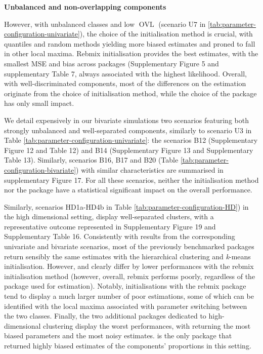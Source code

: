 \textbf{Unbalanced and non-overlapping components}

However, with unbalanced classes and low \(\operatorname{OVL}\) (scenario U7 in
\ref{tab:parameter-configuration-univariate}), the choice of the
initialisation method is crucial, with quantiles and random
methods yielding more biased estimates and proned to fall in other local
maxima. Rebmix initialisation provides the best estimates, with the
smallest MSE and bias across packages (Supplementary Figure
5 and supplementary Table 7, always associated with the highest likelihood. Overall, with
well-discriminated components, most of the differences on the estimation
originate from the choice of initialisation method, while the choice of
the package has only small impact.

We detail expensively in our bivariate simulations two scenarios featuring both strongly unbalanced and well-separated components, similarly to scenario U3 in Table \ref{tab:parameter-configuration-univariate}: the scenarios B12 (Supplementary Figure 12 and Table 12) and B14 (Supplementary Figure 13 and Supplementary Table 13). Similarly, scenarios B16, B17 and B20 (Table \ref{tab:parameter-configuration-bivariate}) with similar characteristics are summarised in supplementary Figure 17. For all these scenarios, neither the initialisation method nor the package have a statistical significant impact on the overall performance.

Similarly, scenarios HD1a-HD4b in Table \ref{tab:parameter-configuration-HD}) in the high dimensional setting, display well-separated clusters, with a representative outcome represented in Supplementary Figure 19 and Supplementary Table 16. Consistently with results from the corresponding univariate and bivariate scenarios, most of the previously benchmarked packages return sensibly the same estimates with the hierarchical clustering and \emph{k}-means initialisation. However,  and  clearly differ by lower performances with the rebmix initialisation method (however, overall, rebmix performs poorly, regardless of the package used for estimation). Notably, initialisations with the rebmix package tend to display a much larger number of poor estimations, some of which can be identified with the local maxima associated with parameter switching between the two classes. Finally, the two additional packages dedicated to high-dimensional clustering display the worst performances, with  returning the most biased parameters and  the most noisy estimates.  is the only package that returned highly biased estimates of the components' proportions in this setting.

